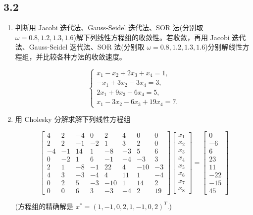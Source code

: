 \subsection*{3.2}
\begin{enumerate}
    \item 判断用 Jacobi 迭代法、Gauss-Seidel 迭代法、SOR 法(分别取 $\omega = 0.8, 1.2, 1.3, 1.6$)解下列线性方程组的收敛性。若收敛，再用 Jacobi 迭代法、Gauss-Seidel 迭代法、SOR 法(分别取 $\omega = 0.8, 1.2, 1.3, 1.6$)分别解线性方程组，并比较各种方法的收敛速度。

\[
\begin{cases}
x_1 - x_2 + 2x_3 + x_4 = 1, \\
-x_1 + 3x_2 - 3x_4 = 3, \\
2x_1 + 9x_3 - 6x_4 = 5, \\
x_1 - 3x_2 - 6x_3 + 19x_4 = 7.
\end{cases}
\]
    \item 用 Cholesky 分解求解下列线性方程组

\[
\begin{bmatrix}
4 & 2 & -4 & 0 & 2 & 4 & 0 & 0 \\
2 & 2 & -1 & -2 & 1 & 3 & 2 & 0 \\
-4 & -1 & 14 & 1 & -8 & -3 & 5 & 6 \\
0 & -2 & 1 & 6 & -1 & -4 & -3 & 3 \\
2 & 1 & -8 & -1 & 22 & 4 & -10 & -3 \\
4 & 3 & -3 & -4 & 4 & 11 & 1 & -4 \\
0 & 2 & 5 & -3 & -10 & 1 & 14 & 2 \\
0 & 0 & 6 & 3 & -3 & -4 & 2 & 19
\end{bmatrix}
\begin{bmatrix}
x_1 \\
x_2 \\
x_3 \\
x_4 \\
x_5 \\
x_6 \\
x_7 \\
x_8 
\end{bmatrix}
=
\begin{bmatrix}
0 \\
-6 \\
6 \\
23 \\
11 \\
-22 \\
-15 \\
45
\end{bmatrix}
\]

(方程组的精确解是 $x^* = (1, -1, 0, 2, 1, -1, 0, 2)^T$.)
\end{enumerate}


